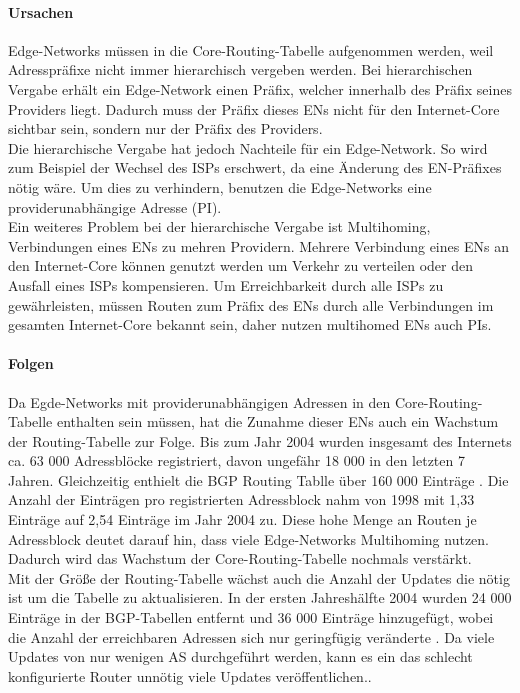 \paragraph{Ursachen}
Edge-Networks müssen in die Core-Routing-Tabelle aufgenommen werden, weil Adresspräfixe nicht immer hierarchisch vergeben werden. Bei hierarchischen Vergabe erhält ein Edge-Network einen Präfix, welcher innerhalb des Präfix seines Providers liegt. Dadurch muss der Präfix dieses ENs nicht für den Internet-Core sichtbar sein, sondern nur der Präfix des Providers. \\
Die hierarchische Vergabe hat jedoch Nachteile für ein Edge-Network. So wird zum Beispiel der Wechsel des ISPs erschwert, da eine Änderung des EN-Präfixes nötig wäre. Um dies zu verhindern, benutzen die Edge-Networks eine providerunabhängige Adresse (PI). \\
Ein weiteres Problem bei der hierarchische Vergabe ist Multihoming, Verbindungen eines ENs zu mehren Providern. Mehrere Verbindung eines ENs an den Internet-Core können genutzt werden um Verkehr zu verteilen oder den Ausfall eines ISPs kompensieren. Um Erreichbarkeit durch alle ISPs zu gewährleisten, müssen Routen zum Präfix des ENs durch alle Verbindungen im gesamten Internet-Core bekannt sein, daher nutzen multihomed ENs auch PIs.

\paragraph{Folgen}
Da Egde-Networks mit providerunabhängigen Adressen in den Core-Routing-Tabelle enthalten sein müssen, hat die Zunahme dieser ENs auch ein Wachstum der Routing-Tabelle zur Folge. Bis zum Jahr 2004 wurden insgesamt des Internets ca. 63 000 Adressblöcke registriert, davon ungefähr 18 000 in den letzten 7 Jahren. Gleichzeitig enthielt die BGP Routing Tablle über 160 000 Einträge \cite{journals/ccr/MengXZHLZ04}.  Die Anzahl der Einträgen pro registrierten Adressblock nahm von 1998 mit 1,33 Einträge auf 2,54 Einträge im Jahr 2004 zu. Diese hohe Menge an Routen je Adressblock deutet darauf hin, dass viele Edge-Networks Multihoming nutzen. Dadurch wird das Wachstum der Core-Routing-Tabelle nochmals verstärkt.\\
Mit der Größe der Routing-Tabelle wächst auch die Anzahl der Updates die nötig ist um die Tabelle zu aktualisieren. In der ersten Jahreshälfte 2004 wurden 24 000 Einträge in der BGP-Tabellen entfernt und 36 000 Einträge hinzugefügt, wobei die Anzahl der erreichbaren Adressen sich nur geringfügig veränderte \cite{journals/ccr/MengXZHLZ04}. Da viele Updates von nur wenigen AS durchgeführt werden, kann es ein das schlecht konfigurierte Router unnötig viele Updates veröffentlichen.\cite{jen:2008:start}. \\

 


